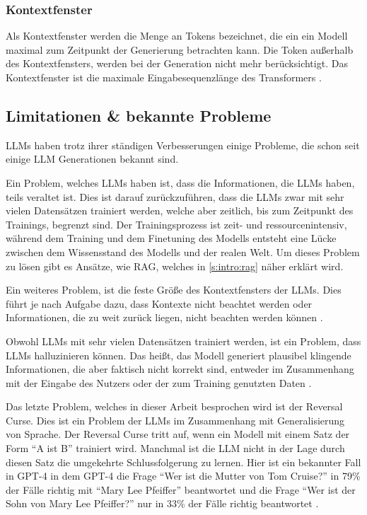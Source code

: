 \subsubsection*{Kontextfenster}
\label{context}
Als Kontextfenster werden die Menge an Tokens bezeichnet, die ein ein Modell 
maximal zum Zeitpunkt der Generierung betrachten kann. Die Token außerhalb 
des Kontextfensters, werden bei der Generation nicht mehr berücksichtigt. 
Das Kontextfenster ist die maximale Eingabesequenzlänge des Transformers \cite{WhatContextWindow}.

\subsection{Limitationen \& bekannte Probleme}
LLMs haben trotz ihrer ständigen Verbesserungen einige Probleme, 
die schon seit einige LLM Generationen bekannt sind.\par
Ein Problem, welches LLMs haben ist, dass die Informationen, die LLMs
haben, teils veraltet ist. Dies ist darauf zurückzuführen, dass die LLMs 
zwar mit sehr vielen Datensätzen trainiert werden, welche aber 
zeitlich, bis zum Zeitpunkt des Trainings, begrenzt sind. Der Trainingsprozess ist zeit- und ressourcenintensiv,
während dem Training und dem Finetuning des Modells entsteht eine Lücke zwischen 
dem Wissensstand des Modells und der realen Welt. Um dieses Problem zu lösen 
gibt es Ansätze, wie RAG, welches in \ref*{s:intro:rag} näher erklärt wird.\par
Ein weiteres Problem, ist die feste Größe des Kontextfensters der LLMs. Dies führt je nach 
Aufgabe dazu, dass Kontexte nicht beachtet werden oder Informationen, die zu weit 
zurück liegen, nicht beachten werden können \cite{wangLimitsSurveyTechniques2024}. \par
Obwohl LLMs mit sehr vielen Datensätzen trainiert werden, ist ein Problem, dass 
LLMs halluzinieren können. Das heißt, das Modell generiert plausibel klingende 
Informationen, die aber faktisch nicht korrekt sind, entweder im Zusammenhang mit der 
Eingabe des Nutzers oder der zum Training genutzten Daten \cite{huangSurveyHallucinationLarge2023}. \par
Das letzte Problem, welches in dieser Arbeit besprochen wird ist der Reversal Curse.
Dies ist ein Problem der LLMs im Zusammenhang mit Generalisierung von Sprache.
Der Reversal Curse tritt auf, wenn ein Modell mit einem Satz der Form ``A ist B''
trainiert wird. Manchmal ist die LLM nicht in der Lage durch diesen Satz die 
umgekehrte Schlussfolgerung zu lernen. Hier ist ein bekannter Fall in GPT-4 
in dem GPT-4 die Frage ``Wer ist die Mutter von Tom Cruise?'' in 79\% der 
Fälle richtig mit ``Mary Lee Pfeiffer'' beantwortet und die Frage ``Wer ist der Sohn von Mary Lee Pfeiffer?''
nur in 33\% der Fälle richtig beantwortet \cite{berglundReversalCurseLLMs2024}.

